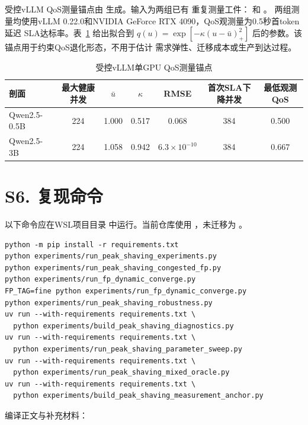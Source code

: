 \documentclass[UTF8,11pt]{ctexart}
\begin{document}
受控vLLM QoS测量锚点由
 生成。输入为两组已有
重复测量工件：
 和
。
两组测量均使用vLLM 0.22.0和NVIDIA GeForce RTX 4090，QoS观测量为0.5秒首token延迟
SLA达标率。表~\ref{tab:vllm_qos_anchor} 给出拟合到
$q(u)=\exp[-\kappa(u-\bar u)^2_+]$ 后的参数。该锚点用于约束QoS退化形态，不用于估计
需求弹性、迁移成本或生产到达过程。

\begin{table}[H]
\centering
\caption{受控vLLM单GPU QoS测量锚点}
\label{tab:vllm_qos_anchor}
\small
\begin{tabular}{lcccccc}
\toprule
剖面 & 最大健康并发 & $\bar u$ & $\kappa$ & RMSE & 首次SLA下降并发 & 最低观测QoS \\
\midrule
Qwen2.5-0.5B & 224 & 1.000 & 0.517 & 0.068 & 384 & 0.500 \\
Qwen2.5-3B & 224 & 1.058 & 0.942 & $6.3\times10^{-10}$ & 384 & 0.667 \\
\bottomrule
\end{tabular}
\end{table}

\section*{S6. 复现命令}

以下命令应在WSL项目目录 
中运行。当前仓库使用 ，未迁移为 。

\begin{verbatim}
python -m pip install -r requirements.txt
python experiments/run_peak_shaving_experiments.py
python experiments/run_peak_shaving_congested_fp.py
python experiments/run_fp_dynamic_converge.py
FP_TAG=fine python experiments/run_fp_dynamic_converge.py
python experiments/run_peak_shaving_robustness.py
uv run --with-requirements requirements.txt \
  python experiments/build_peak_shaving_diagnostics.py
uv run --with-requirements requirements.txt \
  python experiments/run_peak_shaving_parameter_sweep.py
uv run --with-requirements requirements.txt \
  python experiments/run_peak_shaving_mixed_oracle.py
uv run --with-requirements requirements.txt \
  python experiments/build_peak_shaving_measurement_anchor.py
\end{verbatim}

编译正文与补充材料：
\end{document}
